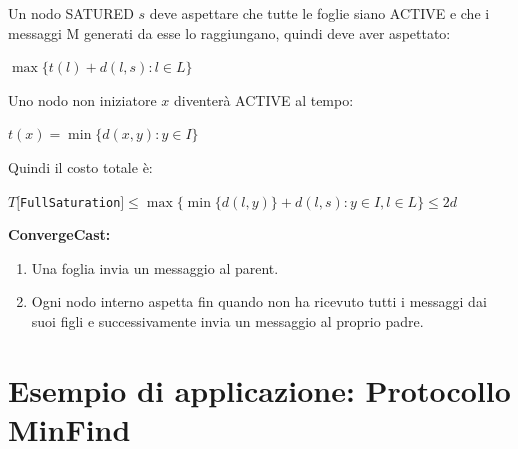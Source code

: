 Un nodo SATURED $s$ deve aspettare che tutte le foglie siano ACTIVE e che i
messaggi M generati da esse lo raggiungano, quindi deve aver aspettato:
\begin{center}
    $\max \lbrace t(l) + d(l,s) : l \in L \rbrace$
\end{center}

Uno nodo non iniziatore $x$ diventerà ACTIVE al tempo:

\begin{center}
    $t(x) = \min \lbrace d(x,y) : y \in I \rbrace$
\end{center}

Quindi il costo totale è:

\begin{center}
    $T[$\texttt{FullSaturation}$] \leq \max \{ \min \{ d(l,y) \} + d(l,s) : y \in
        I, l \in L \} \leq 2d $
\end{center}

\textbf{ConvergeCast:}
\begin{enumerate}
    \item Una foglia invia un messaggio al parent.
    \item Ogni nodo interno aspetta fin quando non ha ricevuto tutti i messaggi
          dai suoi figli e successivamente invia un messaggio al proprio padre.
\end{enumerate}



\section{Esempio di applicazione: Protocollo MinFind}

